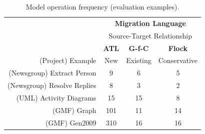 \begin{table}
	\centering
	\begin{tabular}{|r|c|c|c|}
		\hline
		                              & \multicolumn{3}{|c|}{\textbf{Migration Language}} \\
													  			& \multicolumn{3}{|c|}{Source-Target Relationship} \\
		\hline
		                              & \textbf{ATL} & \textbf{G-f-C} & \textbf{Flock} \\
		(Project) Example             & New & Existing & Conservative \\
		\hline
		\hline
		(Newsgroup) Extract Person    & 9  &  6  &  5  \\
		\hline                       
		(Newsgroup) Resolve Replies   &  8  &  3  &  2  \\
		\hline                       
		(UML) Activity Diagrams       &  15  &  15  &  8  \\
		\hline                       
		(GMF) Graph                   &  101  &  11  &  14  \\
		\hline                       
		(GMF) Gen2009                 &  310  &  16  &  16  \\
		\hline
	\end{tabular}
	\caption{Model operation frequency (evaluation examples).}
	\label{tab:model_operations_results}
\end{table}

